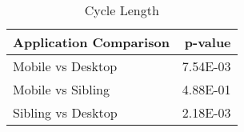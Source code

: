 \begin{table}[ht]
\centering
\caption{Cycle Length} 
\begin{tabular}{lr}
  \hline
Application Comparison & p-value \\ 
  \hline
Mobile vs Desktop & 7.54E-03 \\ 
  Mobile vs Sibling & 4.88E-01 \\ 
  Sibling vs Desktop & 2.18E-03 \\ 
   \hline
\end{tabular}
\end{table}
